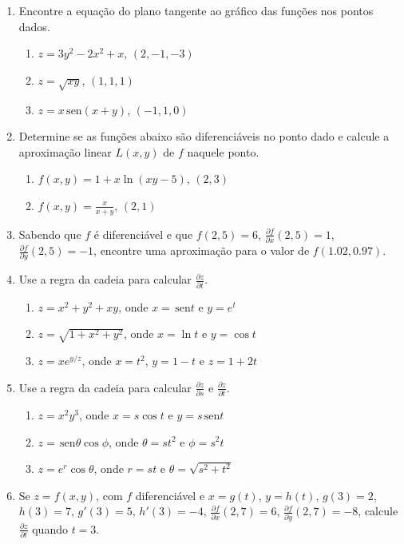 \documentclass[a4paper,5pt]{amsbook}
\newcommand{\sen}{\,\mbox{sen}}
\newcommand{\ds}{\displaystyle}
\begin{document}
\vspace{1cm}
\begin{enumerate}
    \setlength\itemsep{0.5cm}
    \item Encontre a equa\c{c}\~ao do plano tangente ao gr\'afico das fun\c{c}\~oes nos
    pontos dados.
        \begin{enumerate}
            \setlength\itemsep{0.5cm}
            \item $z=3y^2-2x^2+x$, $(2,-1,-3)$
            \item $z=\sqrt{xy}$, $(1,1,1)$
            \item $z=x \sen{(x+y)}$, $(-1,1,0)$
        \end{enumerate}

    \item Determine se as fun\c{c}\~oes abaixo s\~ao diferenci\'aveis no ponto dado e
    calcule a aproxima\c{c}\~ao linear $L(x,y)$ de $f$ naquele ponto.
        \begin{enumerate}
            \setlength\itemsep{0.5cm}
            \item $f(x,y) = 1+x\ln{(xy-5)}$, $(2,3)$
            \item $f(x,y) = \ds\frac{x}{x+y}$, $(2,1)$
        \end{enumerate}

    \item Sabendo que $f$ \'e diferenci\'avel e que $f(2,5)=6$, $\ds\frac{\partial
    f}{\partial x}(2,5)=1$, $\ds\frac{\partial f}{\partial y}(2,5)=-1$,
    encontre uma aproxima\c{c}\~ao para o valor de $f(1.02, 0.97)$.

    \item Use a regra da cadeia para calcular $\ds\frac{\partial z}{\partial t}$.
        \begin{enumerate}
            \setlength\itemsep{0.5cm}
            \item $z=x^2+y^2+xy$, onde $x=\sen{t}$ e $y=e^t$
            \item $z=\sqrt{1+x^2+y^2}$, onde $x=\ln{t}$ e $y=\cos{t}$
            \item $z=xe^{y/z}$, onde $x=t^2$, $y=1-t$ e $z=1+2t$
        \end{enumerate}

    \item Use a regra da cadeia para calcular $\ds\frac{\partial z}{\partial
    s}$ e $\ds\frac{\partial z}{\partial t}$.
        \begin{enumerate}
            \setlength\itemsep{0.5cm}
            \item $z=x^2y^3$, onde $x=s\cos{t}$ e $y=s \sen{t}$
            \item $z=\sen{\theta}\cos{\phi}$, onde $\theta=st^2$ e $\phi=s^2t$
            \item $z=e^r \cos{\theta}$, onde $r=st$ e $\theta=\sqrt{s^2+t^2}$
        \end{enumerate}

    \item Se $z=f(x,y)$, com $f$ diferenci\'avel e $x=g(t)$, $y=h(t)$, $g(3)=2$,
    $h(3)=7$, $g'(3)=5$, $h'(3)=-4$, $\ds\frac{\partial f}{\partial x}(2,7)=6$,
    $\ds\frac{\partial f}{\partial y}(2,7)=-8$, calcule $\ds\frac{\partial
    z}{\partial t}$ quando $t=3$.
\end{enumerate}
\end{document}
